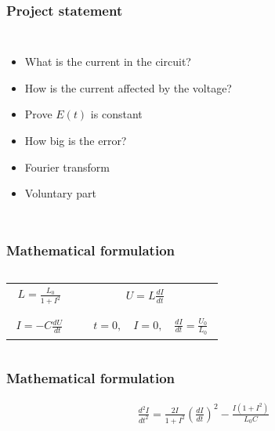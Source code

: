 \documentclass[aspectratio=1610]{beamer}
\begin{document}
\begin{frame}
\frametitle{Project statement}
\begin{columns}
\column{37em}
\begin{itemize}\itemsep1em
  \item<2-> What is the current in the circuit?
  \item<3-> How is the current affected by the voltage?
  \item<4-> Prove $E(t)$ is constant
  \item<5-> How big is the error?
  \item<6-> Fourier transform
  \item<7-> Voluntary part
\end{itemize}
\end{columns}
\end{frame}
\begin{frame}
\frametitle{Mathematical formulation}
\begin{columns}
\column{34em}
\huge
\begin{tabular}{c c}
	{$\!\begin{aligned}
		L = \frac{L_{0}}{1+I^{2}}
	\end{aligned} $}&
		{$\!\begin{aligned}
		U = L\frac{dI}{dt}
	\end{aligned}$}\\\\
		{$\!\begin{aligned}
		I = -C\frac{dU}{dt}
	\end{aligned}$}&
		{$\!\begin{aligned}
		\quad t=0, \quad I=0,\quad \frac{dI}{dt}=\frac{U_{0}}{L_{0}}
	\end{aligned}$}
\end{tabular}
\end{columns}
\end{frame}
\begin{frame}
\frametitle{Mathematical formulation}
\huge
\begin{align*}
\frac{d^{2}I}{dt^{2}}=\frac{2I}{1+I^{2}}\left(\frac{dI}{dt}\right)^{2}-\frac{I\left(1+I^{2}\right)}{L_{0}C}
\end{align*}
\end{frame}
\end{document}
